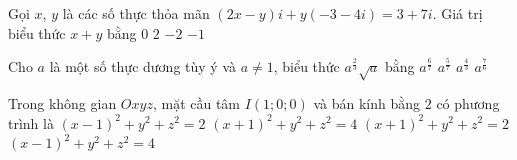 \begin{ex}[BỎ]
	Gọi $x$, $y$ là các số thực thỏa mãn $(2x-y)i+y(-3-4i)=3+7i$. Giá trị biểu thức $x+y$ bằng
	\choice
	{\True $0$}
	{$2$}
	{$-2$}
	{$-1$}
\end{ex}

\begin{ex}%
	Cho $a$ là một số thực dương tùy ý và $a\ne 1$, biểu thức $a^{\tfrac{2}{3}}\sqrt{a}$ bằng
	\choice
	{$a^{\tfrac{6}{7}}$}
	{$a^{\tfrac{5}{7}}$}
	{$a^{\tfrac{4}{3}}$}
	{\True $a^{\tfrac{7}{6}}$}
\end{ex}

\begin{ex}%
	Trong không gian $Oxyz$, mặt cầu tâm $I(1;0;0)$ và bán kính bằng $2$ có phương trình là
	\choice
	{$(x-1)^2+y^2+z^2=2$}
	{$(x+1)^2+y^2+z^2=4$}
	{$(x+1)^2+y^2+z^2=2$}
	{\True $(x-1)^2+y^2+z^2=4$}
\end{ex}

